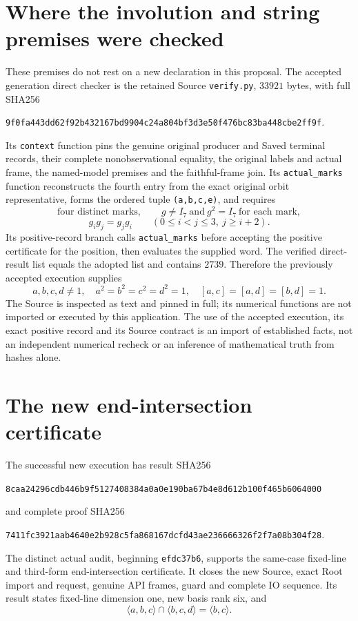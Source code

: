 \documentclass[11pt]{article}
\newcommand{\gen}[1]{\langle #1\rangle}
\begin{document}
\section*{Where the involution and string premises were checked}

These premises do not rest on a new declaration in this proposal.
The accepted generation direct checker is the retained Source
\texttt{verify.py}, $33921$ bytes, with full SHA256
\begin{center}\small\texttt{9f0fa443dd62f92b432167bd9904c24a804bf3d3e50f476bc83ba448cbe2ff9f}.\end{center}
Its \texttt{context} function pins the genuine original producer and
Saved terminal records, their complete nonobservational equality, the
original labels and actual frame, the named-model premises and the
faithful-frame join.  Its \texttt{actual\_marks} function reconstructs
the fourth entry from the exact original orbit representative, forms
the ordered tuple \texttt{(a,b,c,e)}, and requires
\[
 \text{four distinct marks},\qquad
 g\ne I_7\ \text{and}\ g^2=I_7\ \text{for each mark},
\]
\[
 g_i g_j=g_j g_i\qquad(0\le i<j\le3,\ j\ge i+2).
\]
Its positive-record branch calls \texttt{actual\_marks} before accepting
the positive certificate for the position, then evaluates the supplied
word.  The verified direct-result list equals the adopted list and
contains $2739$.  Therefore the previously accepted execution supplies
\begin{equation}\label{eq:string}
 a,b,c,d\ne1,\quad a^2=b^2=c^2=d^2=1,\quad
                    [a,c]=[a,d]=[b,d]=1.
\end{equation}
The Source is inspected as text and pinned in full; its numerical
functions are not imported or executed by this application.  The use
of the accepted execution, its exact positive record and its Source
contract is an import of established facts, not an independent numerical
recheck or an inference of mathematical truth from hashes alone.

\section*{The new end-intersection certificate}

The successful new execution has result SHA256
\begin{center}\small\texttt{8caa24296cdb446b9f5127408384a0a0e190ba67b4e8d612b100f465b6064000}\end{center}
and complete proof SHA256
\begin{center}\small\texttt{7411fc3921aab4640e2b928c5fa868167dcfd43ae236666326f2f7a08b304f28}.\end{center}
The distinct actual audit, beginning \texttt{efdc37b6}, supports the
same-case fixed-line and third-form end-intersection certificate.
It closes the new Source, exact Root import and request, genuine API
frames, guard and complete IO sequence.  Its result states fixed-line
dimension one, new basis rank six, and
\begin{equation}\label{eq:end}
                \gen{a,b,c}\cap\gen{b,c,d}=\gen{b,c}.
\end{equation}
\end{document}

